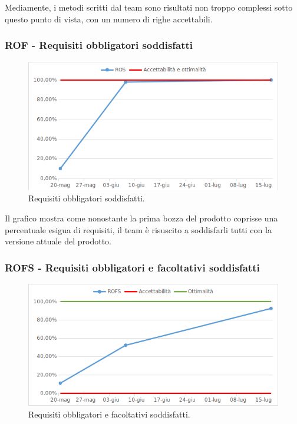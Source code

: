 Mediamente, i metodi scritti dal team sono risultati non troppo complessi sotto questo punto di vista, con un numero di righe accettabili.

\newpage

\subsubsection{ROF - Requisiti obbligatori soddisfatti}

\begin{figure}[h!]
	\centering
	\includegraphics[scale=0.75]{img/Grafici/ROS.png}
	\caption{Requisiti obbligatori soddisfatti.}
\end{figure}

Il grafico mostra come nonostante la prima bozza del prodotto coprisse una percentuale esigua di requisiti, il team è risuscito a soddisfarli tutti con la versione attuale del prodotto.


\subsubsection{ROFS - Requisiti obbligatori e facoltativi soddisfatti}

\begin{figure}[h!]
	\centering
	\includegraphics[scale=0.75]{img/Grafici/ROFS.png}
	\caption{Requisiti obbligatori e facoltativi soddisfatti.}
\end{figure}

